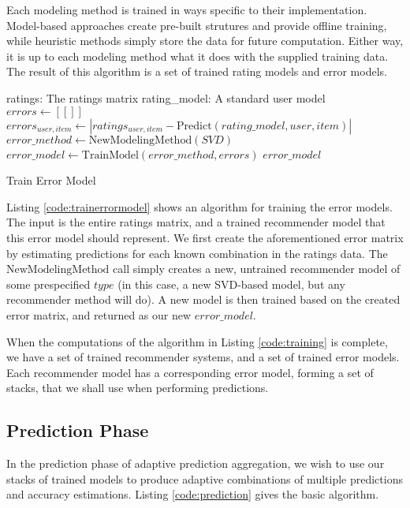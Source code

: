 Each modeling method is trained in ways specific to their implementation. 
Model-based approaches create pre-built strutures and provide offline training,
while heuristic methods simply store the data for future computation.
Either way, it is up to each modeling method what it does with the supplied training data.
The result of this algorithm is a set of trained rating models and error models.

\begin{algorithm}
  \begin{algorithmic}[1]
  \REQUIRE ratings: The ratings matrix
  \REQUIRE rating\_model: A standard user model
  \ENSURE
    \STATE $errors \gets [[]]$
        \STATE $errors_{user,item} \gets | ratings_{user,item} - \mathrm{Predict}(rating\_model, user, item) |$
    \ENDFOR 
    \STATE $error\_method \gets \mathrm{NewModelingMethod}(SVD)$
    \STATE $error\_model  \gets \mathrm{TrainModel}(error\_method, errors)$
  \RETURN $error\_model$
  \end{algorithmic}
  \caption[Training Error Model]{Train Error Model}
  \label{code:trainerrormodel}
\end{algorithm}

Listing \ref{code:trainerrormodel} shows an algorithm for training the error models.
The input is the entire ratings matrix, and a trained recommender model
that this error model should represent.
We first create the aforementioned error matrix by estimating
predictions for each known combination in the ratings data.
The $\mathrm{NewModelingMethod}$ call simply creates a new, untrained
recommender model of some prespecified $type$
(in this case, a new SVD-based model, but any recommender method will do).
A new model is then trained based on the created error matrix,
and returned as our new $error\_model$.

When the computations of the algorithm in Listing \ref{code:training} is complete,
we have a set of trained recommender systems, and a set of trained error models.
Each recommender model has a corresponding error model,
forming a set of stacks, that we shall use when performing predictions.


\subsection{Prediction Phase}

In the prediction phase of adaptive prediction aggregation,
we wish to use our stacks of trained models to produce adaptive
combinations of multiple predictions and accuracy estimations.
Listing \ref{code:prediction} gives the basic algorithm.

